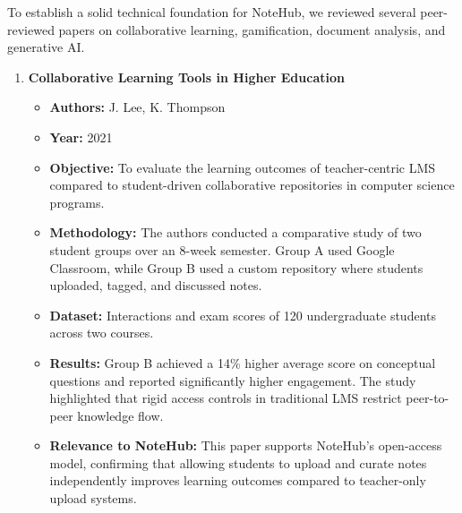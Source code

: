\documentclass[12,Times new Roman,a4paper]{report}
\begin{document}
To establish a solid technical foundation for NoteHub, we reviewed several peer-reviewed papers on collaborative learning, gamification, document analysis, and generative AI.

\begin{enumerate}
    \item \textbf{Collaborative Learning Tools in Higher Education}
    \begin{itemize}
        \item \textbf{Authors:} J. Lee, K. Thompson
        \item \textbf{Year:} 2021
        \item \textbf{Objective:} To evaluate the learning outcomes of teacher-centric LMS compared to student-driven collaborative repositories in computer science programs.
        \item \textbf{Methodology:} The authors conducted a comparative study of two student groups over an 8-week semester. Group A used Google Classroom, while Group B used a custom repository where students uploaded, tagged, and discussed notes.
        \item \textbf{Dataset:} Interactions and exam scores of 120 undergraduate students across two courses.
        \item \textbf{Results:} Group B achieved a 14\% higher average score on conceptual questions and reported significantly higher engagement. The study highlighted that rigid access controls in traditional LMS restrict peer-to-peer knowledge flow.
        \item \textbf{Relevance to NoteHub:} This paper supports NoteHub's open-access model, confirming that allowing students to upload and curate notes independently improves learning outcomes compared to teacher-only upload systems.
    \end{itemize}


\end{enumerate}
\end{document}
